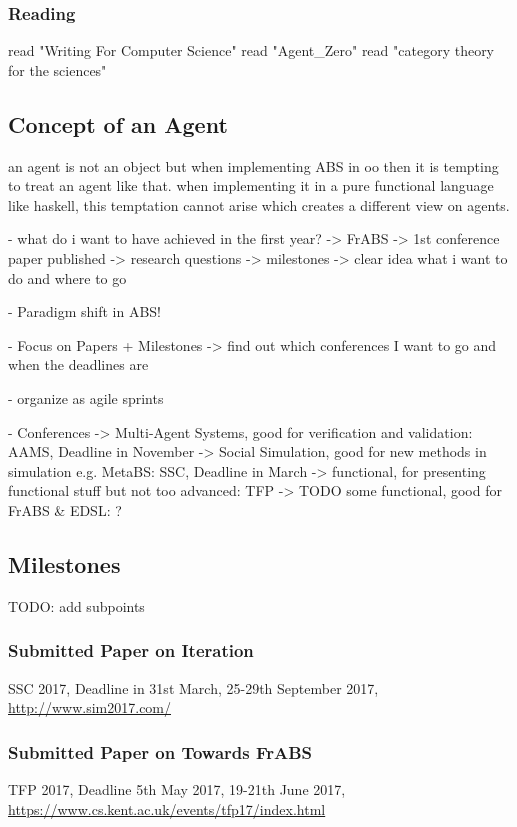 \subsubsection{Reading}
read "Writing For Computer Science"
read "Agent\_Zero"
read "category theory for the sciences"


\subsection{Concept of an Agent}
an agent is not an object but when implementing ABS in oo then it is tempting to treat an agent like that. when implementing it in a pure functional language like haskell, this temptation cannot arise which creates a different view on agents.



- what do i want to have achieved in the first year?
	-> FrABS
	-> 1st conference paper published
	-> research questions
	-> milestones
	-> clear idea what i want to do and where to go
	
- Paradigm shift in ABS!

- Focus on Papers + Milestones
	-> find out which conferences I want to go and when the deadlines are

- organize as agile sprints

- Conferences
	-> Multi-Agent Systems, good for verification and validation: 			AAMS, Deadline in November
	-> Social Simulation, good for new methods in simulation e.g. MetaBS: 	SSC, Deadline in March
	-> functional, for presenting functional stuff but not too advanced:	TFP	
	-> TODO some functional, good for FrABS \& EDSL:						?


\subsection{Milestones}

TODO: add subpoints

\subsubsection*{Submitted Paper on Iteration}
SSC 2017, Deadline in 31st March, 25-29th September 2017, \url{http://www.sim2017.com/}

\subsubsection*{Submitted Paper on Towards FrABS}
TFP 2017, Deadline 5th May 2017, 19-21th June 2017, \url{https://www.cs.kent.ac.uk/events/tfp17/index.html}

